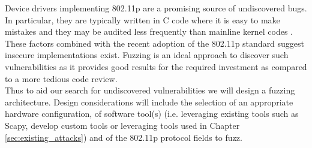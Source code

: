 Device drivers implementing 802.11p are a promising source of undiscovered bugs. In particular, they are typically written in C code where it is easy to make mistakes and they may be audited less frequently than mainline kernel codes \cite{butti2008discovering}. These factors combined with the recent adoption of the 802.11p standard suggest insecure implementations exist. Fuzzing is an ideal approach to discover such vulnerabilities as it provides good results for the required investment as compared to a more tedious code review.\\

Thus to aid our search for undiscovered vulnerabilities we will design a fuzzing architecture. Design considerations will include the selection of an appropriate hardware configuration, of software tool(s) (i.e. leveraging existing tools such as Scapy, develop custom tools or leveraging tools used in Chapter \ref{sec:existing_attacks}) and of the 802.11p protocol fields to fuzz.